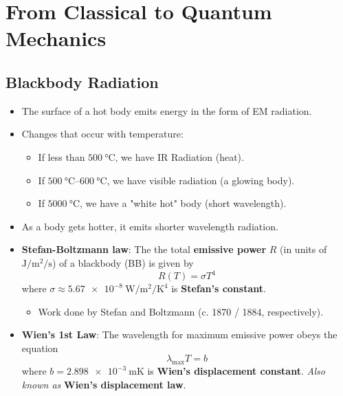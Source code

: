 \documentclass[../notes.tex]{subfiles}
\begin{document}
\chapter{From Classical to Quantum Mechanics}
\section{Blackbody Radiation}
\begin{itemize}
    \item {}The surface of a hot body emits energy in the form of EM radiation.
    \item Changes that occur with temperature:
    \begin{itemize}
        \item If less than $\SI{500}{\celsius}$, we have IR Radiation (heat).
        \item If $\SIrange{500}{600}{\celsius}$, we have visible radiation (a glowing body).
        \item If $\SI{5000}{\celsius}$, we have a "white hot" body (short wavelength).
    \end{itemize}
    \item As a body gets hotter, it emits shorter wavelength radiation.
    \item \textbf{Stefan-Boltzmann law}: The the total \textbf{emissive power} $R$ (in units of $\si{\joule\per\square\meter\per\second}$) of a blackbody (BB) is given by
    \begin{equation*}
        R(T) = \sigma T^4
    \end{equation*}
    where $\sigma\approx\SI{5.67e-8}{\watt\per\square\meter\per\kelvin\tothe{4}}$ is \textbf{Stefan's constant}.
    \begin{itemize}
        \item Work done by Stefan and Boltzmann (c. 1870 / 1884, respectively).
    \end{itemize}
    \item \textbf{Wien's 1st Law}: The wavelength for maximum emissive power obeys the equation
    \begin{equation*}
        \lambda_\text{max}T = b
    \end{equation*}
    where $b=\SI{2.898e-3}{\meter\kelvin}$ is \textbf{Wien's displacement constant}. \emph{Also known as} \textbf{Wien's displacement law}.
    \begin{figure}[h!]
        \centering
\end{figure}
\end{itemize}
\end{document}
